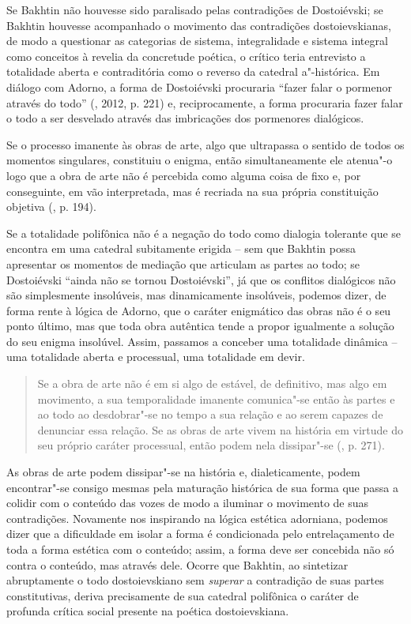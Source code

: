 {{Se Bakhtin não houvesse sido paralisado pelas contradições de
Dostoiévski; se Bakhtin houvesse acompanhado o movimento das
contradições dostoievskianas, de modo a questionar as categorias de
sistema, integralidade e sistema integral como conceitos à revelia da
concretude poética, o crítico teria entrevisto a totalidade aberta e
contraditória como o reverso da catedral a"-histórica. Em diálogo com
Adorno, a forma de Dostoiévski procuraria ``fazer falar o pormenor
através do todo'' (, 2012, p. 221) e, reciprocamente, a forma
procuraria fazer falar o todo a ser desvelado através das imbricações
dos pormenores dialógicos.

Se o processo imanente às obras de arte, algo que ultrapassa o sentido
de todos os momentos singulares, constituiu o enigma, então
simultaneamente ele atenua"-o logo que a obra de arte não é percebida
como alguma coisa de fixo e, por conseguinte, em vão interpretada, mas é
recriada na sua própria constituição objetiva (, p. 194).

Se a totalidade polifônica não é a negação do todo como dialogia
tolerante que se encontra em uma catedral subitamente erigida -- sem que
Bakhtin possa apresentar os momentos de mediação que articulam as partes
ao todo; se Dostoiévski ``ainda não se tornou Dostoiévski'', já que os
conflitos dialógicos não são simplesmente insolúveis, mas dinamicamente
insolúveis, podemos dizer, de forma rente à lógica de Adorno, que o
caráter enigmático das obras não é o seu ponto último, mas que toda obra
autêntica tende a propor igualmente a solução do seu enigma insolúvel.
Assim, passamos a conceber uma totalidade dinâmica -- uma totalidade
aberta e processual, uma totalidade em devir.

\begin{quote}
Se a obra de arte não é em si algo de estável, de definitivo, mas algo
em movimento, a sua temporalidade imanente comunica"-se então às partes e
ao todo ao desdobrar"-se no tempo a sua relação e ao serem capazes de
denunciar essa relação. Se as obras de arte vivem na história em virtude
do seu próprio caráter processual, então podem nela dissipar"-se (,
p. 271).
\end{quote}

As obras de arte podem dissipar"-se na história e, dialeticamente, podem
encontrar"-se consigo mesmas pela maturação histórica de sua forma que
passa a colidir com o conteúdo das vozes de modo a iluminar o movimento
de suas contradições. Novamente nos inspirando na lógica estética
adorniana, podemos dizer que a dificuldade em isolar a forma é
condicionada pelo entrelaçamento de toda a forma estética com o
conteúdo; assim, a forma deve ser concebida não só contra o conteúdo,
mas através dele. Ocorre que Bakhtin, ao sintetizar abruptamente o todo
dostoievskiano sem \emph{superar} a contradição de suas partes
constitutivas, deriva precisamente de sua catedral polifônica o caráter
de profunda crítica social presente na poética dostoievskiana.

}}
